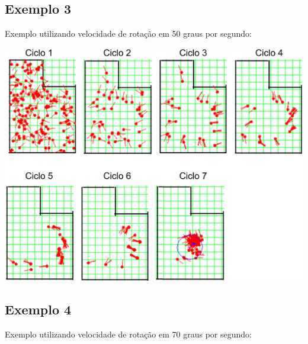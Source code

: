 \subsection{Exemplo 3}

Exemplo utilizando velocidade de rotação em 50 graus por segundo:

{\centering
\includegraphics[scale=0.4]{figuras/cen2_ex3.eps}
\label{img:cen2_ex3}
\par}

\subsection{Exemplo 4}

Exemplo utilizando velocidade de rotação em 70 graus por segundo:

